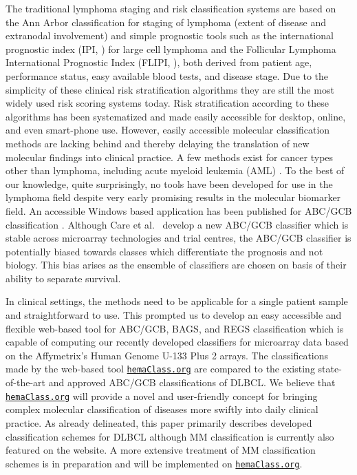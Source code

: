 \documentclass[twocolumn]{bmcart}%
\newcommand{\hemaClass}{\href{http://hemaClass.org}{\texttt{hemaClass.org}}}
\begin{document}
The traditional lymphoma staging and risk classification systems are based on the Ann Arbor classification for staging of lymphoma (extent of disease and extranodal involvement) and simple prognostic tools such as the international prognostic index (IPI, \cite{IPI}) for large cell lymphoma and the Follicular Lymphoma International Prognostic Index (FLIPI, \cite{FLIPI}), both derived from patient age, performance status, easy available blood tests, and disease stage.
Due to the simplicity of these clinical risk stratification algorithms they are still the most widely used risk scoring systems today.
Risk stratification according to these algorithms has been systematized and made easily accessible for desktop, online, and even smart-phone use.
However, easily accessible molecular classification methods are lacking behind and thereby delaying the translation of new molecular findings into clinical practice.
A few methods exist for cancer types other than lymphoma, including acute myeloid leukemia (AML) \cite{Huang2009}.
To the best of our knowledge, quite surprisingly, no tools have been developed for use in the lymphoma field despite very early promising results in the molecular biomarker field.
An accessible Windows based application has been published for ABC/GCB classification \cite{Care2013}.
Although Care et al.~\cite{Care2013} develop a new ABC/GCB classifier which is stable across microarray technologies and trial centres, the ABC/GCB classifier is potentially biased towards classes which differentiate the prognosis and not biology.
This bias arises as the ensemble of classifiers are chosen on basis of their ability to separate survival.

In clinical settings, the methods need to be applicable for a single patient sample and straightforward to use.
This prompted us to develop an easy accessible and flexible web-based tool for ABC/GCB, BAGS, and REGS classification which is capable of computing our recently developed classifiers for microarray data based on the Affymetrix's Human Genome U-133 Plus 2 arrays.
The classifications made by the web-based tool \hemaClass{} are compared to the existing state-of-the-art and approved ABC/GCB classifications of DLBCL.
We believe that \hemaClass{} will provide a novel and user-friendly concept for bringing complex molecular classification of diseases more swiftly into daily clinical practice.
As already delineated, this paper primarily describes developed classification schemes for DLBCL although MM classification is currently also featured on the website.
A more extensive treatment of MM classification schemes is in preparation and will be implemented on \hemaClass{}.
\end{document}

